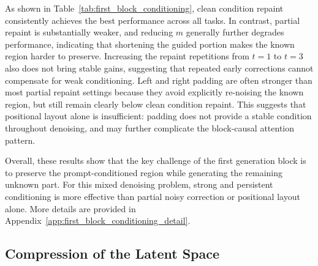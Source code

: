 As shown in Table~\ref{tab:first_block_conditioning}, clean condition repaint consistently achieves the best performance across all tasks. In contrast, partial repaint is substantially weaker, and reducing $m$ generally further degrades performance, indicating that shortening the guided portion makes the known region harder to preserve. Increasing the repaint repetitions from $t=1$ to $t=3$ also does not bring stable gains, suggesting that repeated early corrections cannot compensate for weak conditioning. Left and right padding are often stronger than most partial repaint settings because they avoid explicitly re-noising the known region, but still remain clearly below clean condition repaint. This suggests that positional layout alone is insufficient: padding does not provide a stable condition throughout denoising, and may further complicate the block-causal attention pattern.

Overall, these results show that the key challenge of the first generation block is to preserve the prompt-conditioned region while generating the remaining unknown part. For this mixed denoising problem, strong and persistent conditioning is more effective than partial noisy correction or positional layout alone. More details are provided in Appendix~\ref{app:first_block_conditioning_detail}.

\subsection{Compression of the Latent Space}
\label{dis:latent_compression}

